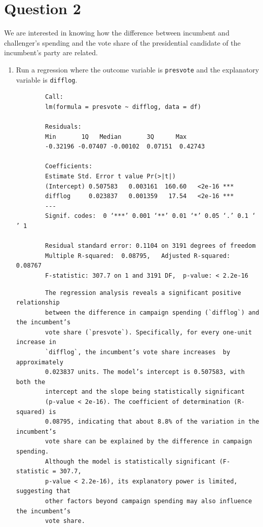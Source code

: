 \documentclass[12pt,letterpaper]{article}
\begin{document}
\section*{Question 2}
\noindent We are interested in knowing how the difference between incumbent and challenger's spending and the vote share of the presidential candidate of the incumbent's party are related.	\vspace{.25cm}
	\begin{enumerate}
		\item Run a regression where the outcome variable is \texttt{presvote} and the explanatory variable is \texttt{difflog}.	
		  
		\begin{verbatim}
		Call:
		lm(formula = presvote ~ difflog, data = df)
		
		Residuals:
		Min       1Q   Median       3Q      Max 
		-0.32196 -0.07407 -0.00102  0.07151  0.42743 
		
		Coefficients:
		Estimate Std. Error t value Pr(>|t|)    
		(Intercept) 0.507583   0.003161  160.60   <2e-16 ***
		difflog     0.023837   0.001359   17.54   <2e-16 ***
		---
		Signif. codes:  0 ‘***’ 0.001 ‘**’ 0.01 ‘*’ 0.05 ‘.’ 0.1 ‘ ’ 1
		
		Residual standard error: 0.1104 on 3191 degrees of freedom
		Multiple R-squared:  0.08795,	Adjusted R-squared:  0.08767 
		F-statistic: 307.7 on 1 and 3191 DF,  p-value: < 2.2e-16
		\end{verbatim}	\begin{verbatim}
		The regression analysis reveals a significant positive relationship 
		between the difference in campaign spending (`difflog`) and the incumbent’s 
		vote share (`presvote`). Specifically, for every one-unit increase in    
		`difflog`, the incumbent’s vote share increases  by approximately 
		0.023837 units. The model’s intercept is 0.507583, with both the
		intercept and the slope being statistically significant 
		(p-value < 2e-16). The coefficient of determination (R-squared) is
		0.08795, indicating that about 8.8% of the variation in the incumbent’s
		vote share can be explained by the difference in campaign spending.
		Although the model is statistically significant (F-statistic = 307.7, 
		p-value < 2.2e-16), its explanatory power is limited, suggesting that 
		other factors beyond campaign spending may also influence the incumbent’s 
		vote share.
		\end{verbatim}	
		

\end{enumerate}
\end{document}
